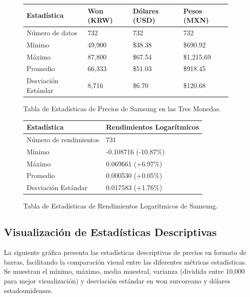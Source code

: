 \documentclass[12pt, a4paper]{article}
\begin{document}
\begin{figure}[H]
    \centering
    \begin{tabularx}{\textwidth}{@{}lXXX@{}}
        \toprule
        \textbf{Estadística} & \textbf{Won (KRW)} & \textbf{Dólares (USD)} & \textbf{Pesos (MXN)} \\
        \midrule
        Número de datos & 732 & 732 & 732 \\
        Mínimo & 49,900 & \$38.38 & \$690.92 \\
        Máximo & 87,800 & \$67.54 & \$1,215.69 \\
        Promedio & 66,333 & \$51.03 & \$918.45 \\
        Desviación Estándar & 8,716 & \$6.70 & \$120.68 \\
        \bottomrule
    \end{tabularx}
    \caption{Tabla de Estadísticas de Precios de Samsung en las Tres Monedas.}
    \label{tab:estadisticas_precios}
\end{figure}

\begin{figure}[H]
    \centering
    \begin{tabularx}{\textwidth}{@{}lX@{}}
        \toprule
        \textbf{Estadística} & \textbf{Rendimientos Logarítmicos} \\
        \midrule
        Número de rendimientos & 731 \\
        Mínimo & -0.108716 (-10.87\%) \\
        Máximo & 0.069661 (+6.97\%) \\
        Promedio & 0.000530 (+0.05\%) \\
        Desviación Estándar & 0.017583 (+1.76\%) \\
        \bottomrule
    \end{tabularx}
    \caption{Tabla de Estadísticas de Rendimientos Logarítmicos de Samsung.}
    \label{tab:estadisticas_rendimientos}
\end{figure}

\subsection*{Visualización de Estadísticas Descriptivas}
La siguiente gráfica presenta las estadísticas descriptivas de precios en formato de barras, facilitando la comparación visual entre las diferentes métricas estadísticas. Se muestran el mínimo, máximo, media muestral, varianza (dividida entre 10,000 para mejor visualización) y desviación estándar en won surcoreano y dólares estadounidenses.
\end{document}
